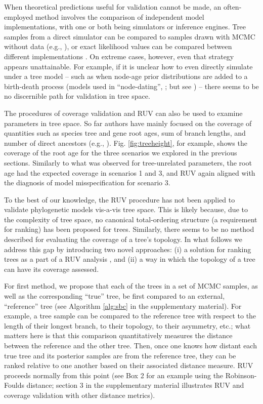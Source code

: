 \documentclass[oneside]{article}
\begin{document}
When theoretical predictions useful for validation cannot be made, an often-employed method involves the comparison of independent model implementations, with one or both being simulators or inference engines.
Tree samples from a direct simulator can be compared to samples drawn with MCMC without data (e.g., \citealp{zhang23}), or exact likelihood values can be compared between different implementations \citep{andreoletti22}.
On extreme cases, however, even that strategy appears unattainable.
For example, if it is unclear how to even directly simulate under a tree model -- such as when node-age prior distributions are added to a birth-death process (models used in ``node-dating'', \citealp{ho09}; but see \citealp{heled12}) -- there seems to be no discernible path for validation in tree space.

The procedures of coverage validation and RUV can also be used to examine parameters in tree space.
So far authors have mainly focused on the coverage of quantities such as species tree and gene root ages, sum of branch lengths, and number of direct ancestors (e.g., \citealp{gavryushkina14,ogilvie22,zhang23}).
Fig. \ref{fig:treeheight}, for example, shows the coverage of the root age for the three scenarios we explored in the previous sections.
Similarly to what was observed for tree-unrelated parameters, the root age had the expected coverage in scenarios 1 and 3, and RUV again aligned with the diagnosis of model misspecification for scenario 3.

To the best of our knowledge, the RUV procedure has not been applied to validate phylogenetic models vis-a-vis tree space.
This is likely because, due to the complexity of tree space, no canonical total-ordering structure (a requirement for ranking) has been proposed for trees.
Similarly, there seems to be no method described for evaluating the coverage of a tree's topology.
In what follows we address this gap by introducing two novel approaches: (i) a solution for ranking trees as a part of a  RUV analysis , and (ii) a way in which the topology of a tree can have its coverage assessed.

For first method, we propose that each of the trees in a set of MCMC samples, as well as the corresponding ``true'' tree, be first compared to an external, ``reference'' tree (see Algorithm \ref{alg:sbc} in the supplementary material).
For example, a tree sample can be compared to the reference tree with respect to the length of their longest branch, to their topology, to their asymmetry, etc.;
what matters here is that this comparison quantitatively measures the distance between the reference and the other tree.
Then, once one knows how distant each true tree and its posterior samples are from the reference tree, they can be ranked relative to one another based on their associated distance measure.
RUV proceeds normally from this point (see Box 2 for an example using the Robinson-Foulds distance; section 3 in the supplementary material illustrates RUV and coverage validation with other distance metrics).
\end{document}
